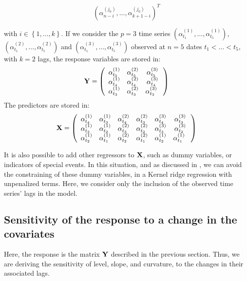 \begin{equation}
\left( \alpha^{(j_0)}_{n-i}, \ldots, \alpha^{(j_0)}_{k+1-i} \right)^T
\end{equation}

with $i \in
\left\lbrace 1, \ldots, k \right\rbrace$. If we consider the $p = 3$ time series $(\alpha^{(1)}_{t_1}, \ldots,  \alpha^{(1)}_{t_5})$, $(\alpha^{(2)}_{t_1}, \ldots,  \alpha^{(2)}_{t_5})$ and $(\alpha^{(3)}_{t_1}, \ldots,  \alpha^{(3)}_{t_5})$ observed at $n = 5$ dates $t_1 < \ldots < t_5$, with $k = 2$ lags,  the response variables are stored in:
$$
{\bf Y} = \left( {\begin{array}{ccc} \alpha^{(1)}_{t_5} &  \alpha^{(2)}_{t_5} &  \alpha^{(3)}_{t_5}\\ \alpha^{(1)}_{t_4} & \alpha^{(2)}_{t_4} & \alpha^{(3)}_{t_4} \\ \alpha^{(1)}_{t_3} & \alpha^{(2)}_{t_3} & \alpha^{(3)}_{t_3}\      \end{array} } \right)
$$
The predictors are stored in:
$$
{\bf X} = \left( {\begin{array}{cccccc} \alpha^{(1)}_{t_4} & \alpha^{(1)}_{t_3} & \alpha^{(2)}_{t_4} & \alpha^{(2)}_{t_3} & \alpha^{(3)}_{t_4} & \alpha^{(3)}_{t_3} \\ \alpha^{(1)}_{t_3} & \alpha^{(1)}_{t_2} & \alpha^{(2)}_{t_3} & \alpha^{(2)}_{t_2} & \alpha^{(3)}_{t_3} & \alpha^{(3)}_{t_2} \\ \alpha^{(1)}_{t_2} & \alpha^{(1)}_{t_1} & \alpha^{(2)}_{t_2} & \alpha^{(2)}_{t_1} & \alpha^{(1)}_{t_2} & \alpha^{(1)}_{t_1} \      \end{array} }\right)
$$


It is also possible to add other regressors to ${\bf X}$, such as dummy variables, or indicators of special events. In this situation, and as discussed in \cite{exterkate2016nonlinear}, we can avoid the constraining of these dummy variables, in a Kernel ridge regression with unpenalized terms. Here, we consider only the inclusion of the observed time series' lags in the model.

\subsection{Sensitivity of the response to a change in the covariates}
\label{sec:sensitivity1}

Here, the response is the matrix ${\bf Y}$ described in the previous section. Thus, we are deriving the sensitivity of level, slope, and curvature, to the changes in their associated lags. 

